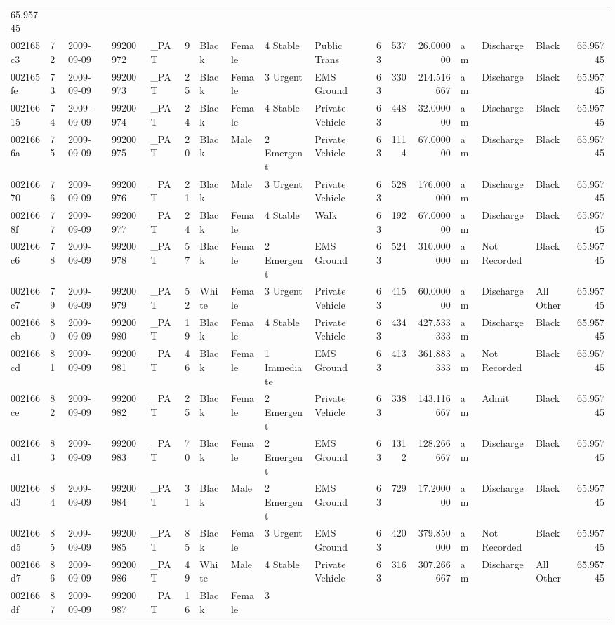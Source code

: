 \documentclass[]{elsarticle} %
\begin{document}
\begin{longtable}[]{@{}lllllrllllrrrlllr@{}}
65.95745\tabularnewline
002165c3 & 72 & 2009-09-09 & 99200972 & \_PAT & 9 & Black & Female & 4
Stable & Public Trans & 63 & 537 & 26.000000 & am & Discharge & Black &
65.95745\tabularnewline
002165fe & 73 & 2009-09-09 & 99200973 & \_PAT & 25 & Black & Female & 3
Urgent & EMS Ground & 63 & 330 & 214.516667 & am & Discharge & Black &
65.95745\tabularnewline
00216615 & 74 & 2009-09-09 & 99200974 & \_PAT & 24 & Black & Female & 4
Stable & Private Vehicle & 63 & 448 & 32.000000 & am & Discharge & Black
& 65.95745\tabularnewline
0021666a & 75 & 2009-09-09 & 99200975 & \_PAT & 20 & Black & Male & 2
Emergent & Private Vehicle & 63 & 1114 & 67.000000 & am & Discharge &
Black & 65.95745\tabularnewline
00216670 & 76 & 2009-09-09 & 99200976 & \_PAT & 21 & Black & Male & 3
Urgent & Private Vehicle & 63 & 528 & 176.000000 & am & Discharge &
Black & 65.95745\tabularnewline
0021668f & 77 & 2009-09-09 & 99200977 & \_PAT & 24 & Black & Female & 4
Stable & Walk & 63 & 192 & 67.000000 & am & Discharge & Black &
65.95745\tabularnewline
002166c6 & 78 & 2009-09-09 & 99200978 & \_PAT & 57 & Black & Female & 2
Emergent & EMS Ground & 63 & 524 & 310.000000 & am & Not Recorded &
Black & 65.95745\tabularnewline
002166c7 & 79 & 2009-09-09 & 99200979 & \_PAT & 52 & White & Female & 3
Urgent & Private Vehicle & 63 & 415 & 60.000000 & am & Discharge & All
Other & 65.95745\tabularnewline
002166cb & 80 & 2009-09-09 & 99200980 & \_PAT & 19 & Black & Female & 4
Stable & Private Vehicle & 63 & 434 & 427.533333 & am & Discharge &
Black & 65.95745\tabularnewline
002166cd & 81 & 2009-09-09 & 99200981 & \_PAT & 46 & Black & Female & 1
Immediate & EMS Ground & 63 & 413 & 361.883333 & am & Not Recorded &
Black & 65.95745\tabularnewline
002166ce & 82 & 2009-09-09 & 99200982 & \_PAT & 25 & Black & Female & 2
Emergent & Private Vehicle & 63 & 338 & 143.116667 & am & Admit & Black
& 65.95745\tabularnewline
002166d1 & 83 & 2009-09-09 & 99200983 & \_PAT & 70 & Black & Female & 2
Emergent & EMS Ground & 63 & 1312 & 128.266667 & am & Discharge & Black
& 65.95745\tabularnewline
002166d3 & 84 & 2009-09-09 & 99200984 & \_PAT & 31 & Black & Male & 2
Emergent & EMS Ground & 63 & 729 & 17.200000 & am & Discharge & Black &
65.95745\tabularnewline
002166d5 & 85 & 2009-09-09 & 99200985 & \_PAT & 85 & Black & Female & 3
Urgent & EMS Ground & 63 & 420 & 379.850000 & am & Not Recorded & Black
& 65.95745\tabularnewline
002166d7 & 86 & 2009-09-09 & 99200986 & \_PAT & 49 & White & Male & 4
Stable & Private Vehicle & 63 & 316 & 307.266667 & am & Discharge & All
Other & 65.95745\tabularnewline
002166df & 87 & 2009-09-09 & 99200987 & \_PAT & 16 & Black & Female & 3

\end{longtable}
\end{document}
